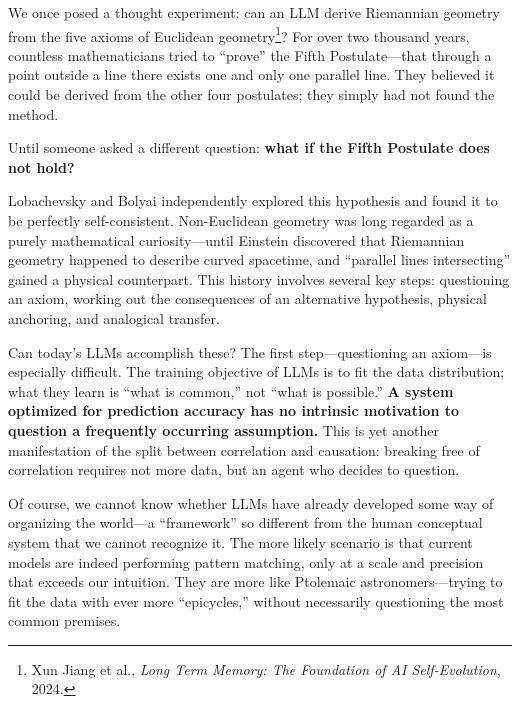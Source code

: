 We once posed a thought experiment: can an LLM derive Riemannian geometry from the five axioms of Euclidean geometry\footnote{Xun Jiang et al., \textit{Long Term Memory: The Foundation of AI Self-Evolution}, 2024.}? For over two thousand years, countless mathematicians tried to ``prove'' the Fifth Postulate---that through a point outside a line there exists one and only one parallel line. They believed it could be derived from the other four postulates; they simply had not found the method.

\vspace{1em}

Until someone asked a different question: \textbf{what if the Fifth Postulate does not hold?}

Lobachevsky and Bolyai independently explored this hypothesis and found it to be perfectly self-consistent. Non-Euclidean geometry was long regarded as a purely mathematical curiosity---until Einstein discovered that Riemannian geometry happened to describe curved spacetime, and ``parallel lines intersecting'' gained a physical counterpart. This history involves several key steps: questioning an axiom, working out the consequences of an alternative hypothesis, physical anchoring, and analogical transfer.

\vspace{1em}

Can today's LLMs accomplish these? The first step---questioning an axiom---is especially difficult. The training objective of LLMs is to fit the data distribution; what they learn is ``what is common,'' not ``what is possible.'' \textbf{A system optimized for prediction accuracy has no intrinsic motivation to question a frequently occurring assumption.} This is yet another manifestation of the split between correlation and causation: breaking free of correlation requires not more data, but an agent who decides to question.

\vspace{1em}

Of course, we cannot know whether LLMs have already developed some way of organizing the world---a ``framework'' so different from the human conceptual system that we cannot recognize it. The more likely scenario is that current models are indeed performing pattern matching, only at a scale and precision that exceeds our intuition. They are more like Ptolemaic astronomers---trying to fit the data with ever more ``epicycles,'' without necessarily questioning the most common premises.

